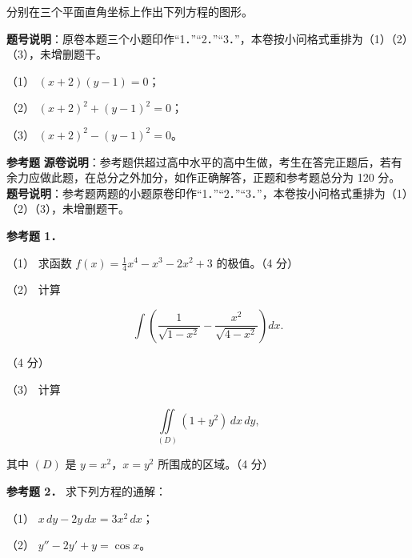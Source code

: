 \begin{question}
分别在三个平面直角坐标上作出下列方程的图形。

\begin{gktip}
\textbf{题号说明}：原卷本题三个小题印作“1．”“2．”“3．”，本卷按小问格式重排为（1）（2）（3），未增删题干。
\end{gktip}

（1） $(x+2)(y-1)=0$；

（2） $(x+2)^2+(y-1)^2=0$；

（3） $(x+2)^2-(y-1)^2=0$。

\begin{gktip}
\textbf{参考题}
\textbf{源卷说明}：参考题供超过高中水平的高中生做，考生在答完正题后，若有余力应做此题，在总分之外加分，如作正确解答，正题和参考题总分为 120 分。
\textbf{题号说明}：参考题两题的小题原卷印作“1．”“2．”“3．”，本卷按小问格式重排为（1）（2）（3），未增删题干。
\end{gktip}

\textbf{参考题 1．}

（1） 求函数 $f(x)=\frac14x^4-x^3-2x^2+3$ 的极值。（4 分）

（2） 计算

\nopagebreak[4]
\[
\int\left(\frac{1}{\sqrt{1-x^2}}-\frac{x^2}{\sqrt{4-x^2}}\right)dx.
\]

（4 分）

（3） 计算

\nopagebreak[4]
\[
\iint\limits_{(D)}(1+y^2)\,dx\,dy,
\]

其中 $(D)$ 是 $y=x^2$，$x=y^2$ 所围成的区域。（4 分）

\textbf{参考题 2．} 求下列方程的通解：

（1） $x\,dy-2y\,dx=3x^2\,dx$；

（2） $y''-2y'+y=\cos x$。

\end{question}